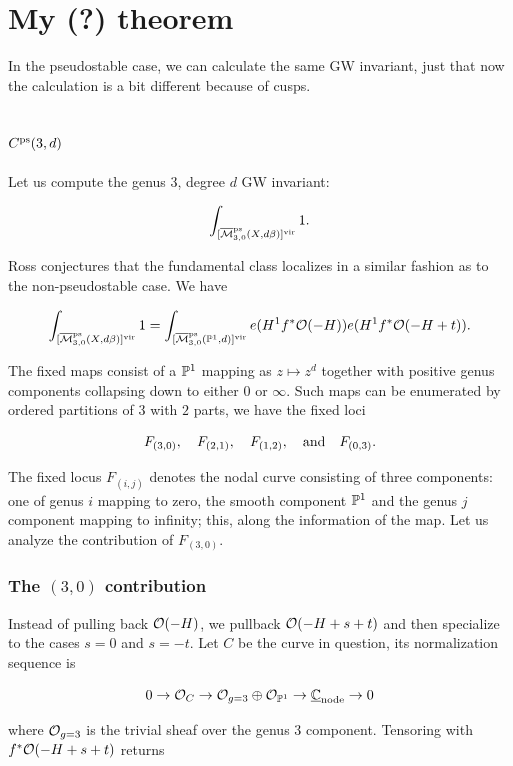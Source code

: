 \documentclass[12pt]{memoir}
\author{\nauthor}
\begin{document}
\section{My (?) theorem}

\iffalse
In the pseudostable case, we can calculate the same GW invariant, just that now the calculation is a bit different because of cusps.

\subsection{\(C^{\operatorname{\mathrm{ps}}}(3,d)\)}

Let us compute the genus 3, degree \(d\) GW invariant:

\[\int_{[\overline{\mathcal{M}}^\text{ps}_{3,0}(X,d\beta)]^{\mathrm{vir}}}1.\]

Ross \cite{DustyNotes} conjectures that the fundamental class localizes in a similar fashion as to the non-pseudostable case. We have

\[\int_{[\overline{\mathcal{M}}^\text{ps}_{3,0}(X,d\beta)]^{\mathrm{vir}}}1=\int_{[\overline{\mathcal{M}}^\text{ps}_{3,0}(\mathbb{P}^1,d)]^{\mathrm{vir}}}e(H^1f^\ast\mathcal{O}(-H))e(H^1f^\ast\mathcal{O}(-H+t)).\]

The fixed maps consist of a \(\mathbb{P}^1\) mapping as \(z\mapsto z^d\) together with positive genus components collapsing down to either \(0\) or \(\infty\). Such maps can be enumerated by ordered partitions of \(3\) with \(2\) parts, we have the fixed loci

\[F_{(3,0)},\quad F_{(2,1)},\quad F_{(1,2)},\quad\text{and}\quad F_{(0,3)}.\]

The fixed locus \(F_{(i,j)}\) denotes the nodal curve consisting of three components: one of genus \(i\) mapping to zero, the smooth component \(\mathbb{P}^1\) and the genus \(j\) component mapping to infinity; this, along the information of the map. Let us analyze the contribution of \(F_{(3,0)}\).

\subsubsection{The \((3,0)\) contribution}

Instead of pulling back \(\mathcal{O}(-H)\), we pullback \(\mathcal{O}(-H+s+t)\) and then specialize to the cases \(s=0\) and \(s=-t\). Let \(C\) be the curve in question, its normalization sequence is

\[0\to\mathcal{O}_C\to \mathcal{O}_{g=3}\oplus\mathcal{O}_{\mathbb{P}^1}\to\underline{\mathbb{C}}_{\text{node}}\to 0\]

where \(\mathcal{O}_{g=3}\) is the trivial sheaf over the genus 3 component. Tensoring with \(f^\ast\mathcal{O}(-H+s+t)\) returns
\end{document}
